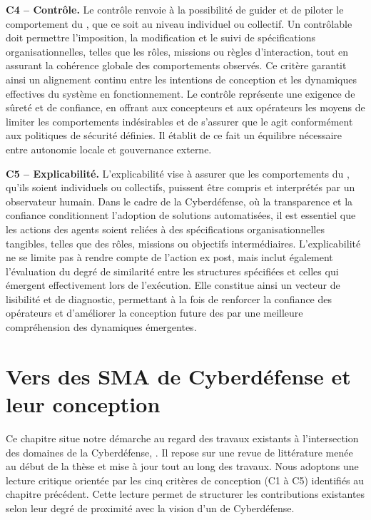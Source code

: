 \medskip

\noindent
\textbf{C4 -- Contrôle.} \quad
Le contrôle renvoie à la possibilité de guider et de piloter le comportement du , que ce soit au niveau individuel ou collectif. Un  contrôlable doit permettre l'imposition, la modification et le suivi de spécifications organisationnelles, telles que les rôles, missions ou règles d'interaction, tout en assurant la cohérence globale des comportements observés. Ce critère garantit ainsi un alignement continu entre les intentions de conception et les dynamiques effectives du système en fonctionnement. Le contrôle représente une exigence de sûreté et de confiance, en offrant aux concepteurs et aux opérateurs les moyens de limiter les comportements indésirables et de s'assurer que le  agit conformément aux politiques de sécurité définies. Il établit de ce fait un équilibre nécessaire entre autonomie locale et gouvernance externe.

\medskip

\noindent
\textbf{C5 -- Explicabilité.} \quad
L'explicabilité vise à assurer que les comportements du , qu'ils soient individuels ou collectifs, puissent être compris et interprétés par un observateur humain. Dans le cadre de la Cyberdéfense, où la transparence et la confiance conditionnent l'adoption de solutions automatisées, il est essentiel que les actions des agents soient reliées à des spécifications organisationnelles tangibles, telles que des rôles, missions ou objectifs intermédiaires. L'explicabilité ne se limite pas à rendre compte de l'action ex post, mais inclut également l'évaluation du degré de similarité entre les structures spécifiées et celles qui émergent effectivement lors de l'exécution. Elle constitue ainsi un vecteur de lisibilité et de diagnostic, permettant à la fois de renforcer la confiance des opérateurs et d'améliorer la conception future des  par une meilleure compréhension des dynamiques émergentes.


\clearpage
\thispagestyle{empty}
\null
\newpage

\chapter{Vers des SMA de Cyberdéfense et leur conception}

% 

\noindent
Ce chapitre situe notre démarche au regard des travaux existants à l'intersection des domaines de la Cyberdéfense, . Il repose sur une revue de littérature menée au début de la thèse et mise à jour tout au long des travaux.
%
Nous adoptons une lecture critique orientée par les cinq critères de conception (C1 à C5) identifiés au chapitre précédent. Cette lecture permet de structurer les contributions existantes selon leur degré de proximité avec la vision d'un  de Cyberdéfense.

